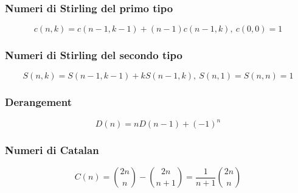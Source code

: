 \subsubsection{Numeri di Stirling del primo tipo}
$$ c(n,k) = c(n-1,k-1) + (n-1) c(n-1,k),\ c(0,0) = 1 $$

\subsubsection{Numeri di Stirling del secondo tipo}
$$ S(n,k) = S(n-1,k-1) + k S(n-1,k),\ S(n,1) = S(n,n) = 1 $$

\subsubsection{Derangement}
$$ D(n)=nD(n-1)+(-1)^n $$

\subsubsection{Numeri di Catalan}
$$ C(n)=\binom{2n}{n}-\binom{2n}{n+1}=\frac{1}{n+1}\binom{2n}{n} $$
